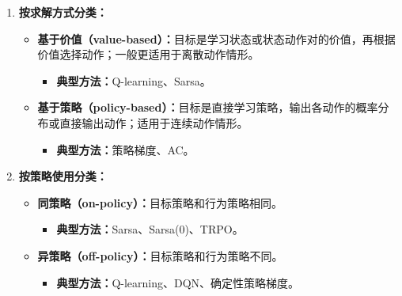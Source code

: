 \documentclass[../main.tex]{subfiles}
\begin{document}
\begin{enumerate}
\begin{enumerate}
\begin{itemize}
            \item \textbf{单步更新：}不需要等到回合结束，而是每一步都进行更新，即 step by step。
            \begin{itemize}
                \item \textbf{典型方法：}Q-learning、Sarsa、策略梯度法。
            \end{itemize}
        \end{itemize}
        
        \item \textbf{按求解方式分类：}
        \begin{itemize}
            \item \textbf{基于价值（value-based）：}目标是学习状态或状态动作对的价值，再根据价值选择动作；一般更适用于离散动作情形。
            \begin{itemize}
                \item \textbf{典型方法：}Q-learning、Sarsa。
            \end{itemize}
            
            \item \textbf{基于策略（policy-based）：}目标是直接学习策略，输出各动作的概率分布或直接输出动作；适用于连续动作情形。
            \begin{itemize}
                \item \textbf{典型方法：}策略梯度、AC。
            \end{itemize}
        \end{itemize}
        
        \item \textbf{按策略使用分类：}
        \begin{itemize}
            \item \textbf{同策略（on-policy）：}目标策略和行为策略相同。
            \begin{itemize}
                \item \textbf{典型方法：}Sarsa、Sarsa($0$)、TRPO。
            \end{itemize}
            
            \item \textbf{异策略（off-policy）：}目标策略和行为策略不同。
            \begin{itemize}
                \item \textbf{典型方法：}Q-learning、DQN、确定性策略梯度。
            \end{itemize}
            

\end{itemize}
\end{enumerate}
\end{enumerate}
\end{document}
